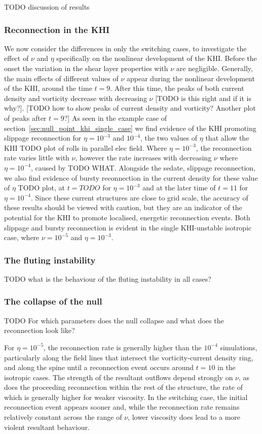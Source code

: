 TODO discussion of results

\subsubsection{Reconnection in the KHI}

We now consider the differences in only the switching cases, to investigate the effect of $\nu$ and $\eta$ specifically on the nonlinear development of the KHI. Before the onset the variation in the shear layer properties with $\nu$ are negligible. Generally, the main effects of different values of $\nu$ appear during the nonlinear development of the KHI, around the time $t=9$. After this time, the peaks of both current density and vorticity decrease with decreasing $\nu$ [TODO is this right and if it is why?]. [TODO how to show peaks of current density and vorticity? Another plot of peaks after $t=9$?] As seen in the example case of section~\ref{sec:null_point_khi_single_case} we find evidence of the KHI promoting slippage reconnection for $\eta = 10^{-3}$ and $10^{-4}$, the two values of $\eta$ that allow the KHI TODO plot of rolls in parallel elec field. Where $\eta=10^{-3}$, the reconnection rate varies little with $\nu$, however the rate increases with decreasing $\nu$ where $\eta=10^{-4}$, caused by TODO WHAT. Alongside the sedate, slippage reconnection, we also find evidence of bursty reconnection in the current density for these value of $\eta$ TODO plot, at $t=TODO$ for $\eta=10^{-3}$ and at the later time of $t=11$ for $\eta=10^{-4}$. Since these current structures are close to grid scale, the accuracy of these results should be viewed with caution, but they are an indicator of the potential for the KHI to promote localised, energetic reconnection events. Both slippage and bursty reconnection is evident in the single KHI-unstable isotropic case, where $\nu=10^{-5}$ and $\eta=10^{-3}$.

\subsubsection{The fluting instability}

TODO what is the behaviour of the fluting instability in all cases?

\subsubsection{The collapse of the null}

TODO For which parameters does the null collapse and what does the reconnection look like?

For $\eta=10^{-5}$, the reconnection rate is generally higher than the $10^{-4}$ simulations, particularly along the field lines that intersect the vorticity-current density ring, and along the spine until a reconnection event occurs around $t=10$ in the isotropic cases. The strength of the resultant outflows depend strongly on $\nu$, as does the proceeding reconnection within the rest of the structure, the rate of which is generally higher for weaker viscosity. In the switching case, the initial reconnection event appears sooner and, while the reconnection rate remains relatively constant across the range of $\nu$, lower viscosity does lead to a more violent resultant behaviour.
